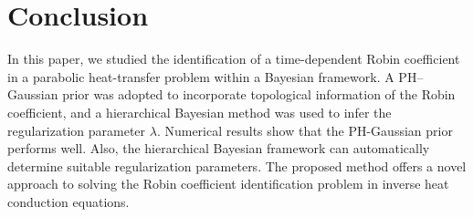 \documentclass{ws-mplb}
\begin{document}
\section{Conclusion}
In this paper, we studied the identification of a time-dependent Robin coefficient in a parabolic heat-transfer problem within a Bayesian framework. A PH–Gaussian prior was adopted to incorporate topological information of the Robin coefficient, and a hierarchical Bayesian method was used to infer the regularization parameter $\lambda$.  Numerical results show that the PH-Gaussian prior performs  well. Also, the hierarchical Bayesian framework can automatically determine suitable regularization parameters. The proposed method offers a novel approach to solving the Robin coefficient identification problem in inverse heat conduction equations.








\end{document}
